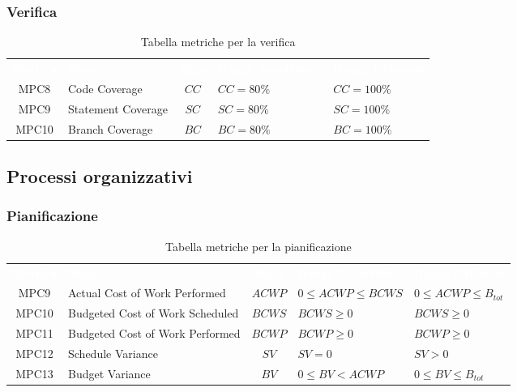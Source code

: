 \subsubsection{Verifica}
    \renewcommand{\arraystretch}{1.5}
    \begin{longtable}{ c C{4cm} c C{3.5cm} C{3.5cm}}
    	\caption{Tabella metriche per la verifica}\\
    	\textcolor{white}{\textbf{Metrica}} & \textcolor{white}{\textbf{Nome}} & \textcolor{white}{\textbf{Sigla}} & \textcolor{white}{\textbf{Range Accettabile}} & \textcolor{white}{\textbf{Range Ottimale}}\\
    	MPC8 & Code Coverage & $CC$ & $CC = 80\%$ & $CC = 100\%$  \\
    	MPC9 & Statement Coverage & $SC$ & $SC = 80\%$ & $SC = 100\%$ \\
    	MPC10 & Branch Coverage & $BC$ & $BC = 80\%$ & $BC = 100\%$ \\
    \end{longtable}
\vspace{0.3cm}
\subsection{Processi organizzativi}

\subsubsection{Pianificazione}
\renewcommand{\arraystretch}{1.5}
\begin{longtable}{ c C{4cm} c C{3.5cm} C{3.5cm}}
	\caption{Tabella metriche per la pianificazione}\\
	\textcolor{white}{\textbf{Metrica}} & \textcolor{white}{\textbf{Nome}} & \textcolor{white}{\textbf{Sigla}} & \textcolor{white}{\textbf{Range Accettabile}} & \textcolor{white}{\textbf{Range Ottimale}}\\
		MPC9 & Actual Cost of Work Performed & $ACWP$ & $0 \leq ACWP \leq BCWS$ & $0 \leq ACWP \leq B_{tot}$ \\
		MPC10 & Budgeted Cost of Work Scheduled & $BCWS$ & $BCWS \geq 0$ &  $BCWS \geq 0$ \\
		MPC11 & Budgeted Cost of Work Performed & $BCWP$ & $BCWP \geq 0$ & $BCWP \geq 0$ \\
		MPC12 & Schedule Variance & $SV$ & $SV = 0$ & $SV > 0$  \\	
		MPC13 & Budget Variance & $BV$ & $0 \leq BV < ACWP$ & $0 \leq BV \leq B_{tot}$  \\
	\end{longtable}